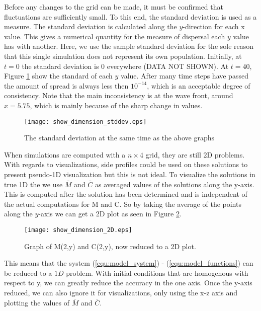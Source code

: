 Before any changes to the grid can be made, it must be confirmed that fluctuations are sufficiently small.
To this end, the standard deviation is used as a measure.
The standard deviation is calculated along the $y$-direction for each x value.
This gives a numerical quantity for the measure of dispersal each $y$ value has with another.
Here, we use the sample standard deviation for the sole reason that this single simulation does not represent its own population.
Initially, at $t =0$ the standard deviation is 0 everywhere (DATA NOT SHOWN).
At $t = 40$, Figure \ref{fig:show_dimension_stddev} show the standard of each $y$ value.
After many time steps have passed the amount of spread is always less then $10^{-14}$, which is an acceptable degree of consistency.
Note that the main inconsistency is at the wave front, around $x = 5.75$, which is mainly because of the sharp change in values.

\begin{figure}[!htp]
  \centering
  \texttt{[image: show\_dimension\_stddev.eps]}
  \caption{The standard deviation at the same time as the above graphs}
  \label{fig:show_dimension_stddev}
\end{figure}

When simulations are computed with a $n \times 4$ grid, they are still 2D problems.
With regards to visualizations, side profiles could be used on these solutions to present pseudo-1D visualization but this is not ideal.
To visualize the solutions in true 1D the we use $\bar{M}$ and $\bar{C}$ as averaged values of the solutions along the y-axis.
This is computed after the solution has been determined and is independent of the actual computations for M and C.
So by taking the average of the points along the $y$-axis we can get a 2D plot as seen in Figure \ref{fig:show_dimension_2D}. 
 
\begin{figure}[!htp]
  \centering
    \texttt{[image: show\_dimension\_2D.eps]}
    \caption{Graph of M(2,y) and C(2,y), now reduced to a 2D plot.}
    \label{fig:show_dimension_2D}
\end{figure}

This means that the system (\ref{equ:model_system}) - (\ref{equ:model_functions}) can be reduced to a $1D$ problem. 
With initial conditions that are homogenous with respect to y, we can greatly reduce the accuracy in the one axis.
Once the y-axis reduced, we can also ignore it for visualizations, only using the x-z axis and plotting the values of $\bar{M}$ and $\bar{C}$.


